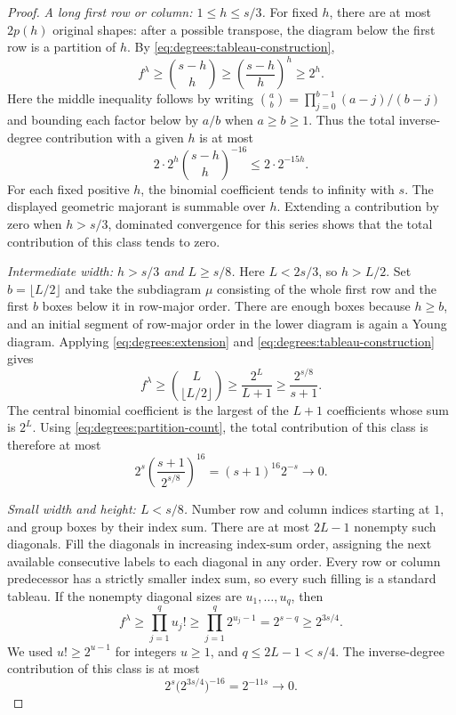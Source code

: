\begin{proof}
\smallskip
\noindent\textit{A long first row or column: $1\le h\le s/3$.}
For fixed $h$, there are at most $2p(h)$ original shapes: after a
possible transpose, the diagram below the first row is a partition
of $h$. By \eqref{eq:degrees:tableau-construction},
\[
  f^\lambda\ge\binom{s-h}{h}
  \ge \left(\frac{s-h}{h}\right)^h\ge 2^h.
\]
Here the middle inequality follows by writing
$\binom{a}{b}=\prod_{j=0}^{b-1}(a-j)/(b-j)$ and bounding each factor
below by $a/b$ when $a\ge b\ge1$.
Thus the total inverse-degree contribution with a given $h$ is at most
\[
  2\cdot 2^h\binom{s-h}{h}^{-16}
  \le 2\cdot 2^{-15h}.
\]
For each fixed positive $h$, the binomial coefficient tends to infinity
with $s$. The displayed geometric majorant is summable over $h$.
Extending a contribution by zero when $h>s/3$, dominated convergence
for this series shows that the total contribution of this class tends
to zero.

\smallskip
\noindent\textit{Intermediate width: $h>s/3$ and $L\ge s/8$.}
Here $L<2s/3$, so $h>L/2$. Set $b=\lfloor L/2\rfloor$ and take
the subdiagram $\mu$ consisting of the whole first row and the first
$b$ boxes below it in row-major order. There are enough boxes because
$h\ge b$, and an initial segment of row-major order in the lower
diagram is again a Young diagram. Applying
\eqref{eq:degrees:extension} and
\eqref{eq:degrees:tableau-construction} gives
\[
  f^\lambda\ge \binom{L}{\lfloor L/2\rfloor}
  \ge \frac{2^L}{L+1}
  \ge \frac{2^{s/8}}{s+1}.
\]
The central binomial coefficient is the largest of the $L+1$
coefficients whose sum is $2^L$. Using
\eqref{eq:degrees:partition-count}, the total contribution of this
class is therefore at most
\begin{equation}
  2^s\left(\frac{s+1}{2^{s/8}}\right)^{16}
  =(s+1)^{16}2^{-s}\longrightarrow0.
  \label{eq:degrees:intermediate}
\end{equation}

\smallskip
\noindent\textit{Small width and height: $L<s/8$.}
Number row and column indices starting at $1$, and group boxes by
their index sum. There are at most $2L-1$ nonempty such diagonals.
Fill the diagonals in increasing index-sum order, assigning the next
available consecutive labels to each diagonal in any order. Every
row or column predecessor has a strictly smaller index sum, so every
such filling is a standard tableau. If the nonempty diagonal sizes
are $u_1,\ldots,u_q$, then
\[
  f^\lambda\ge \prod_{j=1}^q u_j!
  \ge \prod_{j=1}^q 2^{u_j-1}
  =2^{s-q}\ge 2^{3s/4}.
\]
We used $u!\ge2^{u-1}$ for integers $u\ge1$, and
$q\le2L-1<s/4$. The inverse-degree contribution of this class is
at most
\begin{equation}
  2^s\bigl(2^{3s/4}\bigr)^{-16}
  =2^{-11s}\longrightarrow0.
  \label{eq:degrees:small-width}
\end{equation}


\end{proof}

